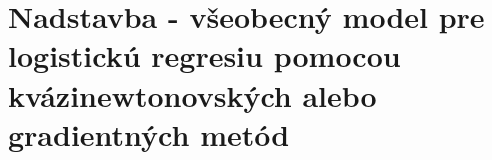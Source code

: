 \documentclass[report.tex]{subfiles}
\begin{document}
	
\section{Nadstavba - všeobecný model pre logistickú regresiu pomocou kvázinewtonovských alebo gradientných metód}\label{sec:H}
	
	
\end{document}
